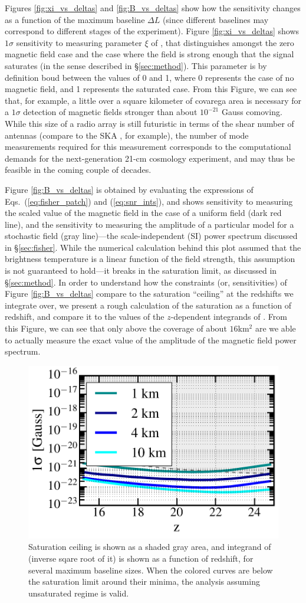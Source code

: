 Figures \ref{fig:xi_vs_deltas} and \ref{fig:B_vs_deltas} show how the sensitivity changes as a function of the maximum baseline $\Delta L$ (since different baselines may correspond to different stages of the experiment). Figure \ref{fig:xi_vs_deltas} shows $1\sigma$ sensitivity to measuring parameter $\xi$ of \eq{\ref{eq:saturated_P}}, that distinguishes amongst the zero magnetic field case and the case where the field is strong enough that the signal saturates (in the sense described in \S\ref{sec:method}). This parameter is by definition boud between the values of 0 and 1, where 0 represents the case of no magnetic field, and 1 represents the saturated case. From this Figure, we can see that, for example, a little over a square kilometer of covarega area is necessary for a $1\sigma$ detection of magnetic fields stronger than about $10^{-21}$ Gauss comoving. While this size of a radio array is still futuristic in terms of the shear number of antennas (compare to the SKA \cite{2008arXiv0802.1727C}, for example), the number of mode measurements required for this measurement corresponds to the computational demands for the next-generation 21-cm cosmology experiment, and may thus be feasible in the coming couple of decades. 

Figure \ref{fig:B_vs_deltas} is obtained by evaluating the expressions of Eqs.~(\ref{eq:fisher_patch}) and (\ref{eq:snr_ints}), and shows sensitivity to measuring the scaled value of the magnetic field in the case of a uniform field (dark red line), and the sensitivity to measuring the amplitude of a particular model for a stochastic field (gray line)---the scale-independent (SI) power spectrum discussed in \S\ref{sec:fisher}. While the numerical calculation behind this plot assumed that the brightness temperature is a linear function of the field strength, this assumption is not guaranteed to hold---it breaks in the saturation limit, as discussed in \S\ref{sec:method}. In order to understand how the constraints (or, sensitivities) of Figure \ref{fig:B_vs_deltas} compare to the saturation ``ceiling'' at the redshifts we integrate over, we present a rough calculation of the saturation as a function of redshift, and compare it to the values of the $z$-dependent integrands of \eq{\ref{eq:fisher_patch}}. From this Figure, we can see that only above the coverage of about $16$km$^2$ are we able to actually measure the exact value of the amplitude of the magnetic field power spectrum.
\begin{figure}
\centering
\includegraphics[width=.35\textwidth,keepaspectratio=true]{sigmaB0_vs_z_midFSTAR.pdf}
\caption{Saturation ceiling is shown as a shaded gray area, and integrand of \eq{\ref{eq:fisher_patch}} (inverse sqare root of it) is shown as a function of redshift, for several maximum baseline sizes.  When the colored curves are below the saturation limit around their minima, the analysis assuming unsaturated regime is valid.\label{fig:Bsat}}
\end{figure}
